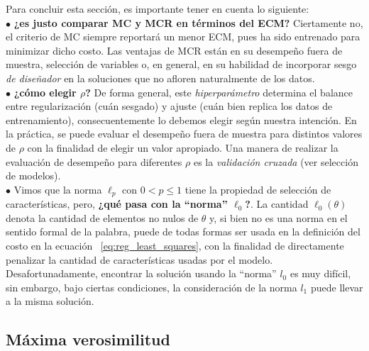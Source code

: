 \begin{mdframed}[style=discusion, frametitle={\center Consideraciones generales}]

Para concluir esta sección, es importante tener en cuenta lo siguiente:\\

$\bullet$ \textbf{¿es justo comparar MC y MCR en términos del ECM?} Ciertamente no, el criterio de MC siempre reportará un menor ECM, pues ha sido entrenado para minimizar dicho costo. Las ventajas de MCR están en su desempeño fuera de muestra, selección de variables o, en  general, en su habilidad de  incorporar  sesgo  \emph{de diseñador} en la soluciones que no afloren naturalmente de los datos. \\

$\bullet$ \textbf{¿cómo elegir $\rho$?} De forma general, este \emph{hiperparámetro} determina el balance entre regularización (cuán  sesgado) y ajuste (cuán bien replica  los datos de entrenamiento), consecuentemente lo debemos elegir según nuestra intención. En la práctica, se puede evaluar el desempeño fuera de muestra para distintos valores de $\rho$ con la finalidad de elegir un valor apropiado. Una manera de realizar la evaluación de desempeño para diferentes $\rho$ es la \emph{validación cruzada} (ver selección de modelos).\\

$\bullet$ Vimos que la norma $\ell_p$ con $0<p\leq1$ tiene la propiedad de selección de características, pero, \textbf{¿qué pasa con la ``norma'' $\ell_0$?}. La cantidad  $\ell_0(\theta)$ denota la cantidad de elementos no nulos de $\theta$ y, si bien no es una norma en el sentido formal de la palabra, puede de todas formas ser usada en la definición del costo en la ecuación ~\eqref{eq:reg_least_squares}, con la finalidad de directamente penalizar la cantidad de características usadas por el modelo. Desafortunadamente, encontrar la solución usando la ``norma'' $l_0$ es muy difícil, sin embargo, bajo ciertas condiciones, la consideración de la norma $l_1$ puede llevar a la misma solución.
\end{mdframed}

\subsection{Máxima verosimilitud}
\label{sub:max_ver}

